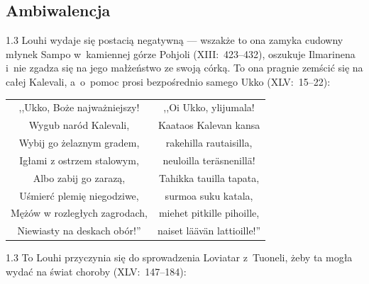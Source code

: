 \documentclass[11pt,a4paper,twoside]{report}
\begin{document}
\subsection*{Ambiwalencja}
\begin{spacing}{1.3}
Louhi wydaje się postacią negatywną --- wszakże to ona zamyka cudowny młynek Sampo w~kamiennej górze Pohjoli (XIII:~423--432), oszukuje Ilmarinena i~nie zgadza się na jego małżeństwo ze swoją córką. To ona pragnie zemścić się na całej Kalevali, a~o~pomoc prosi bezpośrednio samego Ukko (XLV:~15--22):
\end{spacing}
{\centering
\small
\begin{longtable}{c c}
,,Ukko, Boże najważniejszy! & ,,Oi Ukko, ylijumala! \\
Wygub naród Kalevali, & Kaataos Kalevan kansa \\
Wybij go żelaznym gradem, & rakehilla rautaisilla, \\
Igłami z ostrzem stalowym, & neuloilla teräsnenillä! \\
Albo zabij go zarazą, & Tahikka tauilla tapata, \\
Uśmierć plemię niegodziwe, & surmoa suku katala, \\
Mężów w rozległych zagrodach, & miehet pitkille pihoille, \\
Niewiasty na deskach obór!'' &  naiset läävän lattioille!'' \\
\end{longtable}
}
\begin{spacing}{1.3}
To Louhi przyczynia się do sprowadzenia Loviatar z~Tuoneli, żeby ta mogła wydać na świat choroby (XLV:~147--184):
\end{spacing}
\end{document}
